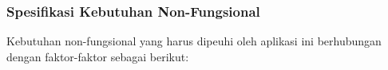 
  \subsubsection{Spesifikasi Kebutuhan Non-Fungsional}
  
  Kebutuhan non-fungsional yang harus dipeuhi oleh aplikasi ini berhubungan dengan faktor-faktor sebagai berikut:

  
  \newpage